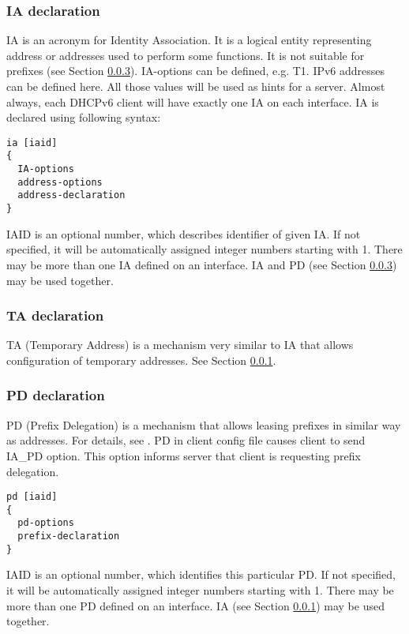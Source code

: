 \subsubsection{IA declaration}
\label{client-scope-ia}
IA is an acronym for Identity Association. It is a logical entity
representing address or addresses used to perform some functions. It
is not suitable for prefixes (see Section \ref{pd-declaration}).
IA-options can be defined, e.g. T1. IPv6 addresses can be defined
here. All those values will be used as hints for a server.  Almost
always, each DHCPv6 client will have exactly one IA on each
interface. IA is declared using following syntax:

\begin{lstlisting}
ia [iaid]
{
  IA-options
  address-options
  address-declaration
}
\end{lstlisting}

IAID is an optional number, which describes identifier of given IA. If
not specified, it will be automatically assigned integer numbers
starting with 1. There may be more than one IA defined on an
interface. IA and PD (see Section \ref{pd-declaration}) may be used
together.

\subsubsection{TA declaration}
\label{client-scope-ta}
TA (Temporary Address) is a mechanism very similar to IA that allows
configuration of temporary addresses. See Section \ref{client-scope-ia}.

\subsubsection{PD declaration}
\label{pd-declaration}
\label{client-scope-pd}
PD (Prefix Delegation) is a mechanism that allows leasing prefixes in
similar way as addresses. For details, see \cite{rfc3633}. PD in
client config file causes client to send IA\_PD option. This option
informs server that client is requesting prefix delegation.

\begin{lstlisting}
pd [iaid]
{
  pd-options
  prefix-declaration
}
\end{lstlisting}
IAID is an optional number, which identifies this particular PD. If
not specified, it will be automatically assigned integer numbers
starting with 1. There may be more than one PD defined on an
interface. IA (see Section \ref{client-scope-ia}) may be used together.

